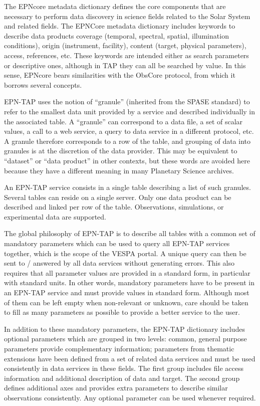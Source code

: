 \documentclass[11pt,a4paper]{ivoa}
\begin{document}
The EPNcore metadata dictionary defines the core components that are necessary to perform data discovery in science fields related to the Solar System and related fields. The EPNCore metadata dictionary includes keywords to describe data products coverage (temporal, spectral, spatial, illumination conditions), origin (instrument, facility), content (target, physical parameters), access, references, etc. These keywords are intended either as search parameters or descriptive ones, although in TAP they can all be searched by value. In this sense, EPNcore bears similarities with the ObsCore protocol, from which it borrows several concepts. 

EPN-TAP uses the notion of ``granule'' (inherited from the SPASE standard) to refer to the smallest data unit provided by a service and described individually in the associated table. A ``granule'' can correspond to a data file, a set of scalar values, a call to a web service, a query to data service in a different protocol, etc. A granule therefore corresponds to a row of the table, and grouping of data into granules is at the discretion of the data provider. This may be equivalent to ``dataset'' or ``data product'' in other contexts, but these words are avoided here because they have a different meaning in many Planetary Science archives.

An EPN-TAP service consists in a single table describing a list of such granules. Several tables can reside on a single server. Only one data product can be described and linked per row of the table. Observations, simulations, or experimental data are supported. 

The global philosophy of EPN-TAP is to describe all tables with a common set of mandatory parameters which can be used to query all EPN-TAP services together, which is the scope of the VESPA portal. A unique query can then be sent to / answered by all data services without generating errors. This also requires that all parameter values are provided in a standard form, in particular with standard units. In other words, mandatory parameters have to be present in an EPN-TAP service and must provide values in standard form. Although most of them can be left empty when non-relevant or unknown, care should be taken to fill as many parameters as possible to provide a better service to the user.  

In addition to these mandatory parameters, the EPN-TAP dictionary includes optional parameters which are grouped in two levels: common, general purpose parameters provide complementary information; parameters from thematic extensions have been defined from a set of related data services and must be used consistently in data services in these fields. The first group includes file access information and additional description of data and target. The second group defines additional axes and provides extra parameters to describe similar observations consistently. Any optional parameter can be used whenever required. 
\end{document}

